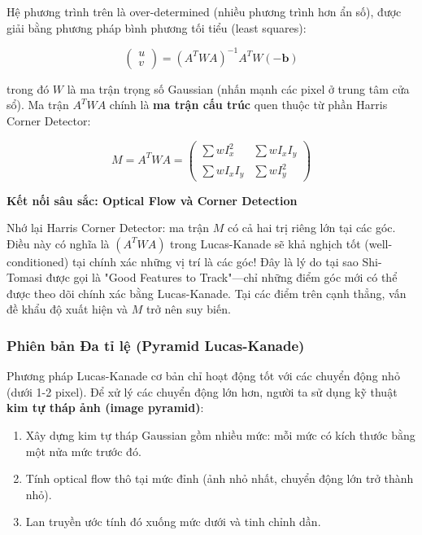 Hệ phương trình trên là over-determined (nhiều phương trình hơn ẩn số), được giải bằng phương pháp bình phương tối tiểu (least squares):

\begin{equation}
    \begin{pmatrix} u \\ v \end{pmatrix}
    = (A^T W A)^{-1} A^T W (-\mathbf{b})
    \label{eq:lucas_kanade_solution}
\end{equation}

trong đó $W$ là ma trận trọng số Gaussian (nhấn mạnh các pixel ở trung tâm cửa sổ). Ma trận $A^T W A$ chính là \textbf{ma trận cấu trúc} quen thuộc từ phần Harris Corner Detector:

\[
    M = A^T W A = \begin{pmatrix} \sum w I_x^2 & \sum w I_x I_y \\ \sum w I_x I_y & \sum w I_y^2 \end{pmatrix}
\]

\begin{mdframed}[style=infobox]
    \textbf{Kết nối sâu sắc: Optical Flow và Corner Detection}

    Nhớ lại Harris Corner Detector: ma trận $M$ có cả hai trị riêng lớn tại các góc. Điều này có nghĩa là $(A^T W A)$ trong Lucas-Kanade sẽ khả nghịch tốt (well-conditioned) tại chính xác những vị trí là các góc! Đây là lý do tại sao Shi-Tomasi được gọi là "Good Features to Track"—chỉ những điểm góc mới có thể được theo dõi chính xác bằng Lucas-Kanade. Tại các điểm trên cạnh thẳng, vấn đề khẩu độ xuất hiện và $M$ trở nên suy biến.
\end{mdframed}

\subsubsection{Phiên bản Đa tỉ lệ (Pyramid Lucas-Kanade)}
\label{subsubsec:lk_pyramid}

Phương pháp Lucas-Kanade cơ bản chỉ hoạt động tốt với các chuyển động nhỏ (dưới 1-2 pixel). Để xử lý các chuyển động lớn hơn, người ta sử dụng kỹ thuật \textbf{kim tự tháp ảnh (image pyramid)}:

\begin{enumerate}
    \item Xây dựng kim tự tháp Gaussian gồm nhiều mức: mỗi mức có kích thước bằng một nửa mức trước đó.
    \item Tính optical flow thô tại mức đỉnh (ảnh nhỏ nhất, chuyển động lớn trở thành nhỏ).
    \item Lan truyền ước tính đó xuống mức dưới và tinh chỉnh dần.
\end{enumerate}

